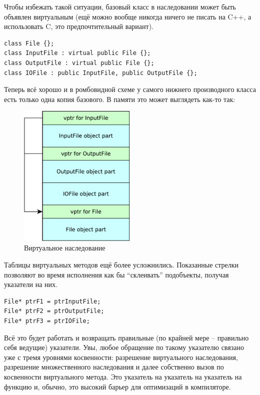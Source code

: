 \documentclass[a4paper,12pt,oneside]{article}
\begin{document}
Чтобы избежать такой ситуации, базовый класс в наследовании может быть объявлен виртуальным (ещё можно вообще никогда ничего не писать на C++, а использовать C, это предпочтительный вариант).

\begin{lstlisting}
class File {};
class InputFile : virtual public File {};
class OutputFile : virtual public File {};
class IOFile : public InputFile, public OutputFile {};
\end{lstlisting}

Теперь всё хорошо и в ромбовидной схеме у самого нижнего производного класса есть только одна копия базового. В памяти это может выглядеть как-то так:

\begin{figure}[h!]
\centering
\includegraphics[width=0.5\textwidth]{illustrations/virtualinh-crop.pdf}
\caption{Виртуальное наследование}
\label{fig:virtualinh-crop}
\end{figure}

Таблицы виртуальных методов ещё более усложнились. Показанные стрелки позволяют во время исполнения как бы ``склеивать'' подобъекты, получая указатели на них.

\begin{lstlisting}
File* ptrF1 = ptrInputFile;
File* ptrF2 = ptrOutputFile;
File* ptrF3 = ptrIOFile;
\end{lstlisting}

Всё это будет работать и возвращать правильные (по крайней мере -- правильно себя ведущие) указатели. Увы, любое обращение по такому указателю связано уже с тремя уровнями косвенности: разрешение виртуального наследования, разрешение множественного наследования и далее собственно вызов по косвенности виртуального метода. Это указатель на указатель на указатель на функцию и, обычно, это высокий барьер для оптимизаций в компиляторе.
\end{document}
